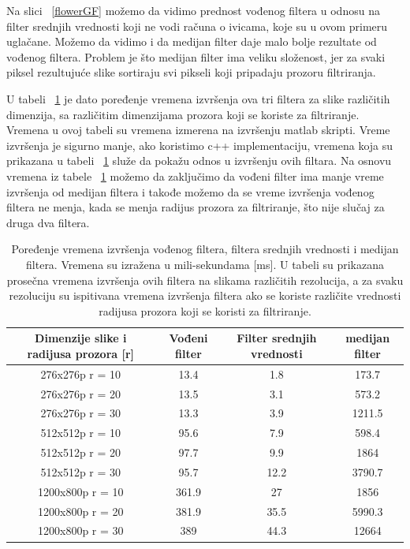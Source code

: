 \documentclass[a4paper,12pt,titlepage]{article}
\begin{document}
Na slici ~\ref{flowerGF} možemo da vidimo prednost vođenog filtera u odnosu na filter srednjih vrednosti koji ne vodi računa o ivicama, koje su u ovom primeru uglačane. Možemo da vidimo i da medijan filter daje malo bolje rezultate od vođenog filtera. Problem je što medijan filter ima veliku složenost, jer za svaki piksel rezultujuće slike sortiraju svi pikseli koji pripadaju prozoru filtriranja.

U tabeli ~\ref{tabela} je dato poređenje vremena izvršenja ova tri filtera za slike različitih dimenzija, sa različitim dimenzijama prozora koji se koriste za filtriranje. Vremena u ovoj tabeli su vremena izmerena na izvršenju matlab skripti. Vreme izvršenja je sigurno manje, ako koristimo c++ implementaciju, vremena koja su prikazana u tabeli ~\ref{tabela} služe da pokažu odnos u izvršenju ovih filtara. Na osnovu vremena iz tabele ~\ref{tabela} možemo da zaključimo da vođeni filter ima manje vreme izvršenja od medijan filtera i takođe možemo da se vreme izvršenja vođenog filtera ne menja, kada se menja radijus prozora za filtriranje, što nije slučaj za druga dva filtera. 

\begin{table}[h!]
\centering
\begin{tabular}{| c | c c c|} 
\hline
Dimenzije slike i radijusa prozora [r] & Vođeni filter & Filter srednjih vrednosti & medijan filter\\ [0.5ex] 
\hline
276x276p r = 10 & 13.4 & 1.8 & 173.7 \\ 
276x276p r = 20 & 13.5 & 3.1 & 573.2 \\
276x276p r = 30 & 13.3 & 3.9 & 1211.5 \\
512x512p r = 10 & 95.6 & 7.9 & 598.4 \\
512x512p r = 20 & 97.7 & 9.9 & 1864 \\
512x512p r = 30 & 95.7 & 12.2 & 3790.7 \\
1200x800p r = 10 & 361.9 & 27 & 1856 \\
1200x800p r = 20 & 381.9 & 35.5 & 5990.3 \\
1200x800p r = 30 & 389 & 44.3 & 12664 \\ [1ex] 
\hline
\end{tabular}
\caption{Poređenje vremena izvršenja vođenog filtera, filtera srednjih vrednosti i medijan filtera. Vremena su izražena u mili-sekundama [ms]. U tabeli su prikazana prosečna vremena izvršenja ovih filtera na slikama različitih rezolucija, a za svaku rezoluciju su ispitivana vremena izvršenja filtera ako se koriste različite vrednosti radijusa prozora koji se koristi za filtriranje. }
\label{tabela}
\end{table}
\end{document}
